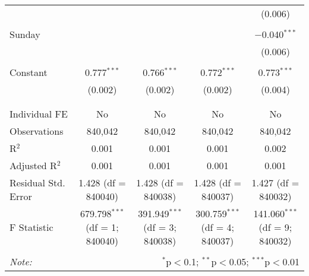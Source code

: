 \documentclass[
]{article}
\begin{document}
\begin{table}[!htbp]
{\begin{tabular}{@{\extracolsep{5pt}}lcccc}
  &  &  &  & (0.006) \\ 
  & & & & \\ 
 Sunday &  &  &  & $-$0.040$^{***}$ \\ 
  &  &  &  & (0.006) \\ 
  & & & & \\ 
 Constant & 0.777$^{***}$ & 0.766$^{***}$ & 0.772$^{***}$ & 0.773$^{***}$ \\ 
  & (0.002) & (0.002) & (0.002) & (0.004) \\ 
  & & & & \\ 
\hline \\[-1.8ex] 
Individual FE & No & No & No & No \\ 
Observations & 840,042 & 840,042 & 840,042 & 840,042 \\ 
R$^{2}$ & 0.001 & 0.001 & 0.001 & 0.002 \\ 
Adjusted R$^{2}$ & 0.001 & 0.001 & 0.001 & 0.001 \\ 
Residual Std. Error & 1.428 (df = 840040) & 1.428 (df = 840038) & 1.428 (df = 840037) & 1.427 (df = 840032) \\ 
F Statistic & 679.798$^{***}$ (df = 1; 840040) & 391.949$^{***}$ (df = 3; 840038) & 300.759$^{***}$ (df = 4; 840037) & 141.060$^{***}$ (df = 9; 840032) \\ 
\hline 
\hline \\[-1.8ex] 
\textit{Note:}  & \multicolumn{4}{r}{$^{*}$p$<$0.1; $^{**}$p$<$0.05; $^{***}$p$<$0.01} \\ 
\end{tabular}
} 
\end{table} 
\newpage
\end{document}
